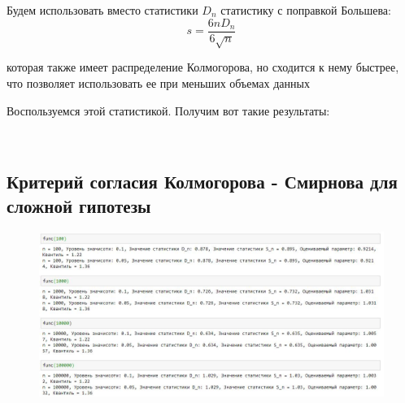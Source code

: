 \documentclass[a4paper,12pt, oneside]{book}
\begin{document}
Будем использовать вместо статистики $ D_n $ статистику с поправкой Большева:
$$
s = \dfrac{6 n D_n}{6 \sqrt{n}}
$$

которая также имеет распределение Колмогорова, но сходится к нему быстрее, что позволяет использовать ее при меньших объемах данных

Воспользуемся этой статистикой. Получим вот такие результаты:

\begin{figure}[h!]
	\begin{center}
		\begin{minipage}[h]{0.47\linewidth}
			\\
		\end{minipage}
	\end{center}
\end{figure}

\newpage
\subsection{Критерий согласия Колмогорова - Смирнова для сложной гипотезы}

\begin{figure}[h!]
	\begin{center}
		\begin{minipage}[h]{0.47\linewidth}
			{\includegraphics[width=1.5\linewidth]{fotos/kolmogor/wre}}\\
		\end{minipage}
	\end{center}
\end{figure}
\end{document}
